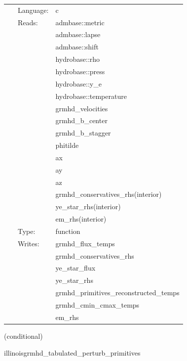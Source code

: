 \documentclass{article}
\begin{document}
 \begin{tabular*}{160mm}{cll} 
~ & Language:  & c \\ 
~ & Reads:  & admbase::metric \\ 
~& ~ &admbase::lapse\\ 
~& ~ &admbase::shift\\ 
~& ~ &hydrobase::rho\\ 
~& ~ &hydrobase::press\\ 
~& ~ &hydrobase::y\_e\\ 
~& ~ &hydrobase::temperature\\ 
~& ~ &grmhd\_velocities\\ 
~& ~ &grmhd\_b\_center\\ 
~& ~ &grmhd\_b\_stagger\\ 
~& ~ &phitilde\\ 
~& ~ &ax\\ 
~& ~ &ay\\ 
~& ~ &az\\ 
~& ~ &grmhd\_conservatives\_rhs(interior)\\ 
~& ~ &ye\_star\_rhs(interior)\\ 
~& ~ &em\_rhs(interior)\\ 
~ & Type:  & function \\ 
~ & Writes:  & grmhd\_flux\_temps \\ 
~& ~ &grmhd\_conservatives\_rhs\\ 
~& ~ &ye\_star\_flux\\ 
~& ~ &ye\_star\_rhs\\ 
~& ~ &grmhd\_primitives\_reconstructed\_temps\\ 
~& ~ &grmhd\_cmin\_cmax\_temps\\ 
~& ~ &em\_rhs\\ 
\end{tabular*} 


\vspace{5mm}

   (conditional) 

\hspace{5mm} illinoisgrmhd\_tabulated\_perturb\_primitives 

\hspace{5mm}{\it tabulated version of illinoisgrmhd\_perturb\_primitives } 


\hspace{5mm}
\end{document}
